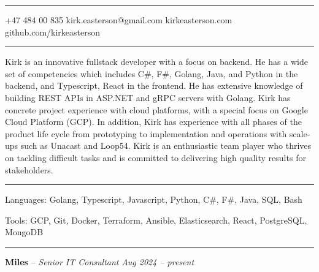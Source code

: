 \documentclass[10pt,letterpaper]{article}
\begin{document}
\begin{center}\hrule\end{center}


\noindent {} \hfill \small +47 484 00 835 \hfill {} \hfill kirk.easterson@gmail.com \hfill {} \hfill kirkeasterson.com \hfill {} \hfill github.com/kirkeasterson \hfill {}
\begin{center}\hrule\end{center}



Kirk is an innovative fullstack developer with a focus on backend. He has a wide set of competencies which includes C\#, F\#, Golang, Java, and Python in the backend, and Typescript, React in the frontend. He has extensive knowledge of building REST APIs in ASP.NET and gRPC servers with Golang. Kirk has concrete project experience with cloud platforms, with a special focus on Google Cloud Platform (GCP). In addition, Kirk has experience with all phases of the product life cycle from prototyping to implementation and operations with scale-ups such as Unacast and Loop54. Kirk is an enthusiastic team player who thrives on tackling difficult tasks and is committed to delivering high quality results for stakeholders.
\begin{center}\hrule\end{center}



\inlineheadsection
{Languages:}
{Golang, Typescript, Javascript, Python, C\#, F\#, Java, SQL, Bash}

\inlineheadsection
{Tools:}
{GCP, Git, Docker, Terraform, Ansible, Elasticsearch, React, PostgreSQL, MongoDB}
\begin{center}\hrule\end{center}



\headedsection
{\textbf{Miles} -- \textit{Senior IT Consultant}}
{\textit{Aug 2024 -- present}} {
}
\end{document}
